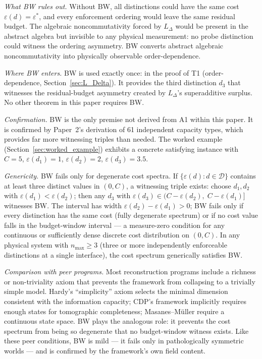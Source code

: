 \documentclass[11pt]{article}
\theoremstyle{remark}
\begin{document}
\smallskip\noindent\textit{What BW rules out.}  Without BW, all distinctions could have the same cost $\varepsilon(d) = \varepsilon^*$, and every enforcement ordering would leave the same residual budget.  The algebraic noncommutativity forced by $L_\Delta$ would be present in the abstract algebra but invisible to any physical measurement: no probe distinction could witness the ordering asymmetry.  BW converts abstract algebraic noncommutativity into physically observable order-dependence.

\smallskip\noindent\textit{Where BW enters.}  BW is used exactly once: in the proof of T1 (order-dependence, Section~\ref{sec:L_Delta}).  It provides the third distinction $d_3$ that witnesses the residual-budget asymmetry created by $L_\Delta$'s superadditive surplus.  No other theorem in this paper requires BW.

\smallskip\noindent\textit{Confirmation.}  BW is the only premise not derived from A1 within this paper.  It is confirmed by Paper~2's derivation of 61 independent capacity types, which provides far more witnessing triples than needed.  The worked example (Section~\ref{sec:worked_example}) exhibits a concrete satisfying instance with $C = 5$, $\varepsilon(d_1) = 1$, $\varepsilon(d_2) = 2$, $\varepsilon(d_3) = 3.5$.

\smallskip\noindent\textit{Genericity.}  BW fails only for degenerate cost spectra.  If $\{\varepsilon(d) : d \in \mathcal{D}\}$ contains at least three distinct values in $(0, C)$, a witnessing triple exists: choose $d_1, d_2$ with $\varepsilon(d_1) < \varepsilon(d_2)$; then any $d_3$ with $\varepsilon(d_3) \in (C - \varepsilon(d_2),\; C - \varepsilon(d_1)]$ witnesses BW.  The interval has width $\varepsilon(d_2) - \varepsilon(d_1) > 0$; BW fails only if every distinction has the same cost (fully degenerate spectrum) or if no cost value falls in the budget-window interval --- a measure-zero condition for any continuous or sufficiently dense discrete cost distribution on $(0, C)$.  In any physical system with $n_{\max} \ge 3$ (three or more independently enforceable distinctions at a single interface), the cost spectrum generically satisfies BW.

\smallskip\noindent\textit{Comparison with peer programs.}  Most reconstruction programs include a richness or non-triviality axiom that prevents the framework from collapsing to a trivially simple model.  Hardy's ``simplicity'' axiom selects the minimal dimension consistent with the information capacity; CDP's framework implicitly requires enough states for tomographic completeness; Masanes--M\"uller require a continuous state space.  BW plays the analogous role: it prevents the cost spectrum from being so degenerate that no budget-window witness exists.  Like these peer conditions, BW is mild --- it fails only in pathologically symmetric worlds --- and is confirmed by the framework's own field content.
\end{document}
